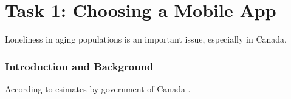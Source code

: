 \part*{Task 1: Choosing a Mobile App}

Loneliness in aging populations is an important issue, especially in Canada.

\section*{Introduction and Background}

According to esimates by government of Canada \cite{author2024}.
